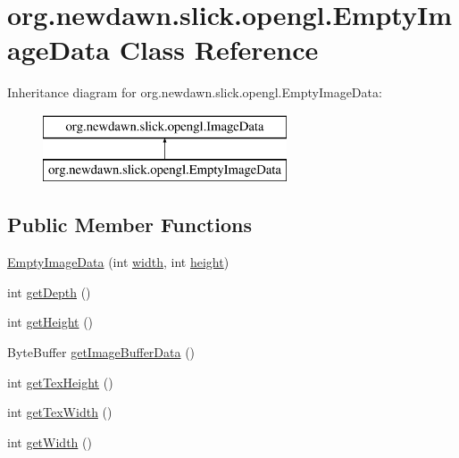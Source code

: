 \hypertarget{classorg_1_1newdawn_1_1slick_1_1opengl_1_1_empty_image_data}{}\section{org.\+newdawn.\+slick.\+opengl.\+Empty\+Image\+Data Class Reference}
\label{classorg_1_1newdawn_1_1slick_1_1opengl_1_1_empty_image_data}
Inheritance diagram for org.\+newdawn.\+slick.\+opengl.\+Empty\+Image\+Data\+:\begin{figure}[H]
\begin{center}
\leavevmode
\includegraphics[height=2.000000cm]{classorg_1_1newdawn_1_1slick_1_1opengl_1_1_empty_image_data}
\end{center}
\end{figure}
\subsection*{Public Member Functions}
\begin{DoxyCompactItemize}
\item 
\mbox{\hyperlink{classorg_1_1newdawn_1_1slick_1_1opengl_1_1_empty_image_data_abbb1aee46053e0d4e4411ec62acc81fa}{Empty\+Image\+Data}} (int \mbox{\hyperlink{classorg_1_1newdawn_1_1slick_1_1opengl_1_1_empty_image_data_a0db414de2bae9de9483a7f3481c48b5e}{width}}, int \mbox{\hyperlink{classorg_1_1newdawn_1_1slick_1_1opengl_1_1_empty_image_data_a190ee87309a0084066aad436a0fc267c}{height}})
\item 
int \mbox{\hyperlink{classorg_1_1newdawn_1_1slick_1_1opengl_1_1_empty_image_data_a59090f7878211b179bcca316e3ea3e2f}{get\+Depth}} ()
\item 
int \mbox{\hyperlink{classorg_1_1newdawn_1_1slick_1_1opengl_1_1_empty_image_data_a438df2e9d7d8b326713750b55d110b36}{get\+Height}} ()
\item 
Byte\+Buffer \mbox{\hyperlink{classorg_1_1newdawn_1_1slick_1_1opengl_1_1_empty_image_data_a85ac68637fe36698d04c74ad4b2f4a52}{get\+Image\+Buffer\+Data}} ()
\item 
int \mbox{\hyperlink{classorg_1_1newdawn_1_1slick_1_1opengl_1_1_empty_image_data_a2b9c2b476faf9f62c172cd8b20350101}{get\+Tex\+Height}} ()
\item 
int \mbox{\hyperlink{classorg_1_1newdawn_1_1slick_1_1opengl_1_1_empty_image_data_ad261b00a724191075cff314442c14baa}{get\+Tex\+Width}} ()
\item 
int \mbox{\hyperlink{classorg_1_1newdawn_1_1slick_1_1opengl_1_1_empty_image_data_af376226fa31451e5ebab8d5570ced40e}{get\+Width}} ()
\end{DoxyCompactItemize}
